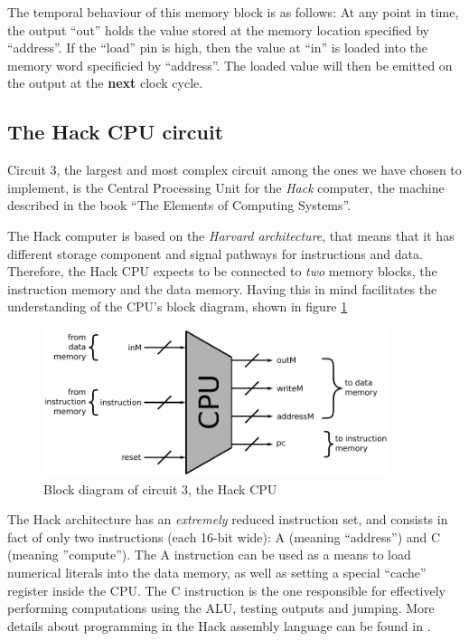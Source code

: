\documentclass[a4paper]{article}
\begin{document}
            The temporal behaviour of this memory block is as follows: At any point in time, the
            output ``out'' holds the value stored at the memory location specified by ``address''.
            If the ``load'' pin is high, then the value at ``in'' is loaded into the memory word
            specificied by ``address''. The loaded value will then be emitted on the output at the
            \textbf{next} clock cycle.

        \subsection{The Hack CPU circuit}
        \label{subsec:hack-cpu-circuit}
            Circuit 3, the largest and most complex circuit among the ones we have chosen to
            implement, is the Central Processing Unit for the \emph{Hack} computer, the machine
            described in the book ``The Elements of Computing Systems''\cite{nand2tetris-book}.

            The Hack computer is based on the \emph{Harvard architecture}, that means that it has
            different storage component and signal pathways for instructions and data. Therefore,
            the Hack CPU expects to be connected to \emph{two} memory blocks, the instruction memory
            and the data memory. Having this in mind facilitates the understanding of the CPU's
            block diagram, shown in figure \ref{fig:cpu-block}
            \begin{figure}[h]
                \begin{center}
                    \includegraphics[width=0.9\textwidth]{imgs/cpu-block.pdf}
                \end{center}
                \label{fig:cpu-block}
                \caption{Block diagram of circuit 3, the Hack CPU}
            \end{figure}

            The Hack architecture has an \emph{extremely} reduced instruction set, and consists in
            fact of only two instructions (each 16-bit wide): A (meaning ``address'') and
            C (meaning ''compute''). The A instruction can be used as a means to load numerical
            literals into the data memory, as well as setting a special ``cache'' register inside
            the CPU. The C instruction is the one responsible for effectively performing
            computations using the ALU, testing outputs and jumping. More details about programming
            in the Hack assembly language can be found in \cite{nand2tetris-book}.
\end{document}
